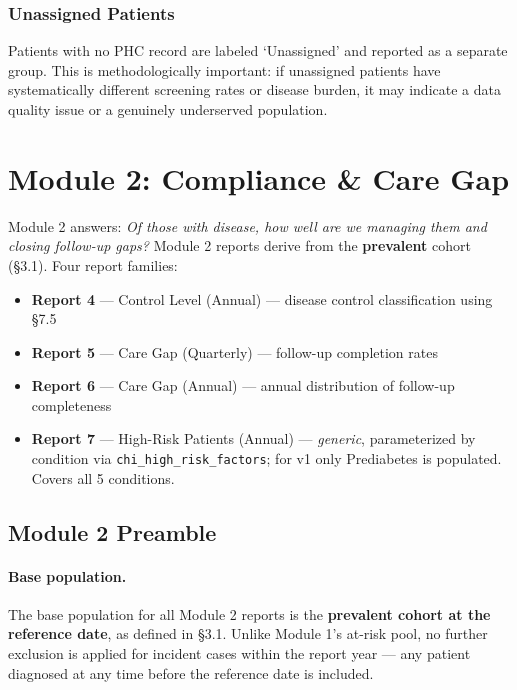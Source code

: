 \documentclass[11pt,a4paper]{article}
\begin{document}
\subsubsection{Unassigned Patients}
Patients with no PHC record are labeled `Unassigned' and reported as a separate group. This is methodologically important: if unassigned patients have systematically different screening rates or disease burden, it may indicate a data quality issue or a genuinely underserved population.


\section{Module 2: Compliance \& Care Gap}

Module 2 answers: \textit{Of those with disease, how well are we managing them and closing follow-up gaps?} Module 2 reports derive from the \textbf{prevalent} cohort (§3.1). Four report families:
\begin{itemize}[leftmargin=*]
    \item \textbf{Report 4} --- Control Level (Annual) --- disease control classification using §7.5
    \item \textbf{Report 5} --- Care Gap (Quarterly) --- follow-up completion rates
    \item \textbf{Report 6} --- Care Gap (Annual) --- annual distribution of follow-up completeness
    \item \textbf{Report 7} --- High-Risk Patients (Annual) --- \emph{generic}, parameterized by condition via \texttt{chi\_high\_risk\_factors}; for v1 only Prediabetes is populated. Covers all 5 conditions.
\end{itemize}

\subsection{Module 2 Preamble}

\paragraph{Base population.}
The base population for all Module 2 reports is the \textbf{prevalent cohort at the reference date}, as defined in §3.1. Unlike Module 1's at-risk pool, no further exclusion is applied for incident cases within the report year --- any patient diagnosed at any time before the reference date is included.
\end{document}
